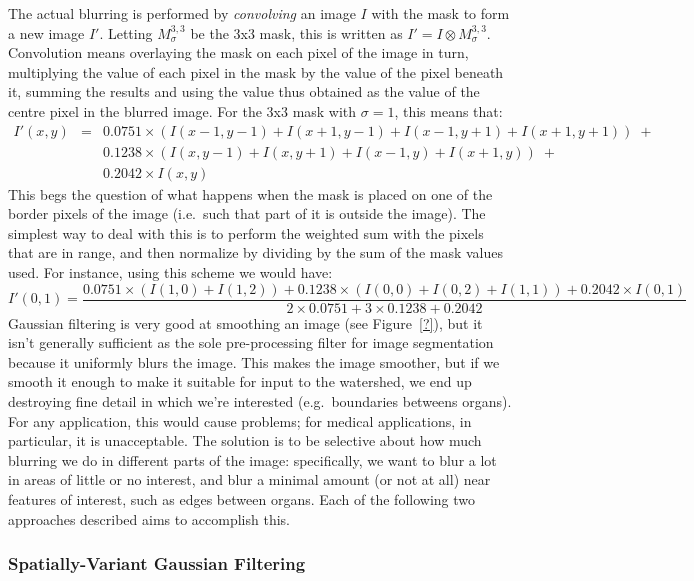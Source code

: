 The actual blurring is performed by \emph{convolving} an image $I$ with the mask to form a new image $I'$. Letting $M_\sigma^{3,3}$ be the 3x3 mask, this is written as $I' = I \otimes M_\sigma^{3,3}$. Convolution means overlaying the mask on each pixel of the image in turn, multiplying the value of each pixel in the mask by the value of the pixel beneath it, summing the results and using the value thus obtained as the value of the centre pixel in the blurred image. For the 3x3 mask with $\sigma = 1$, this means that:
%
\begin{eqnarray*}
I'(x,y)
& = & 0.0751 \times (I(x-1,y-1) + I(x+1,y-1) + I(x-1,y+1) + I(x+1,y+1)) \; + \\
&   & 0.1238 \times (I(x,y-1) + I(x,y+1) + I(x-1,y) + I(x+1,y)) \; + \\
&   & 0.2042 \times I(x,y)
\end{eqnarray*}
%
This begs the question of what happens when the mask is placed on one of the border pixels of the image (i.e.~such that part of it is outside the image). The simplest way to deal with this is to perform the weighted sum with the pixels that are in range, and then normalize by dividing by the sum of the mask values used. For instance, using this scheme we would have:
%
\[
I'(0,1) = \frac{0.0751 \times (I(1,0) + I(1,2)) + 0.1238 \times (I(0,0) + I(0,2) + I(1,1)) + 0.2042 \times I(0,1)}{2 \times 0.0751 + 3 \times 0.1238 + 0.2042}
\]
%
Gaussian filtering is very good at smoothing an image (see Figure~\ref{?}), but it isn't generally sufficient as the sole pre-processing filter for image segmentation because it uniformly blurs the image. This makes the image smoother, but if we smooth it enough to make it suitable for input to the watershed, we end up destroying fine detail in which we're interested (e.g.~boundaries betweens organs). For any application, this would cause problems; for medical applications, in particular, it is unacceptable. The solution is to be selective about how much blurring we do in different parts of the image: specifically, we want to blur a lot in areas of little or no interest, and blur a minimal amount (or not at all) near features of interest, such as edges between organs. Each of the following two approaches described aims to accomplish this.


\subsubsection{Spatially-Variant Gaussian Filtering}

